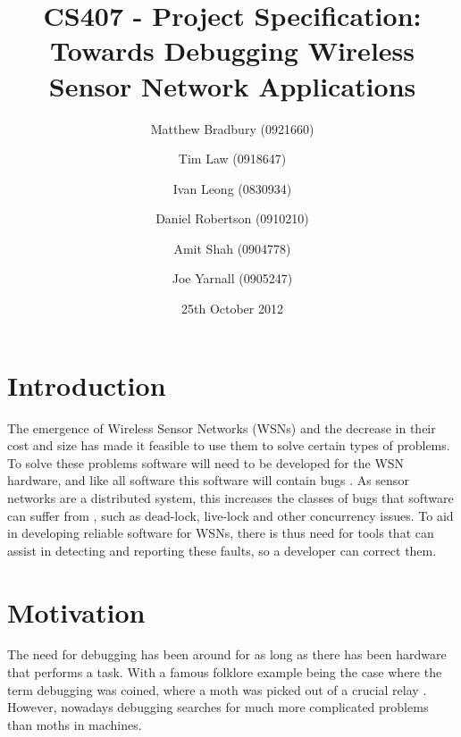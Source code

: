 \documentclass[a4paper]{article}
\title{CS407 - Project Specification:\\
Towards Debugging Wireless Sensor Network Applications}
\date{25th October 2012}
\author{
	Matthew Bradbury (0921660) \and
	Tim Law (0918647) \and
	Ivan Leong (0830934) \and
	Daniel Robertson (0910210) \and
	Amit Shah (0904778) \and
	Joe Yarnall (0905247)
}
\begin{document}
\maketitle

\pagestyle{empty}
\thispagestyle{empty}

\newpage

\pagestyle{plain}
\setcounter{page}{1}

\tableofcontents
\clearpage


\section{Introduction}
The emergence of Wireless Sensor Networks (WSNs) and the decrease in their cost and size has made it feasible to use them to solve certain types of problems. To solve these problems software will need to be developed for the WSN hardware, and like all software this software will contain bugs \cite{5010224}. As sensor networks are a distributed system, this increases the classes of bugs that software can suffer from \cite{5010224}, such as dead-lock, live-lock and other concurrency issues. To aid in developing reliable software for WSNs, there is thus need for tools that can assist in detecting and reporting these faults, so a developer can correct them.

\section{Motivation}

The need for debugging has been around for as long as there has been hardware that performs a task. With a famous folklore example being the case where the term debugging was coined, where a moth was picked out of a crucial relay \cite{shapiro1987etymology}. However, nowadays debugging searches for much more complicated problems than moths in machines.
\end{document}
